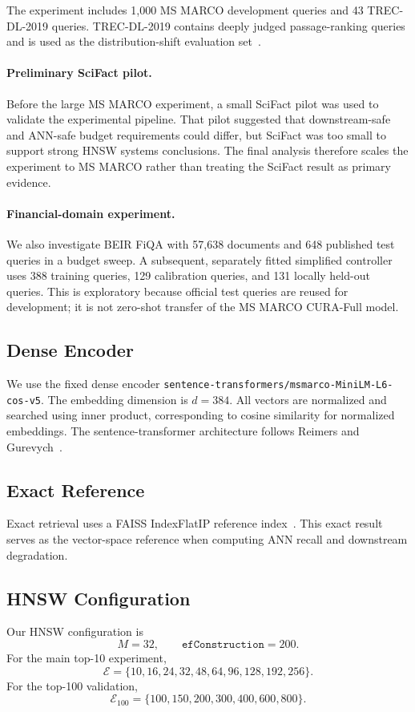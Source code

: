 \documentclass[10pt,twocolumn]{article}
\begin{document}
The experiment includes 1,000 MS MARCO development queries and 43 TREC-DL-2019 queries. TREC-DL-2019 contains deeply judged passage-ranking queries and is used as the distribution-shift evaluation set~\citep{craswell2020trecdl}.

\paragraph{Preliminary SciFact pilot.}
Before the large MS MARCO experiment, a small SciFact pilot was used to validate the experimental pipeline. That pilot suggested that downstream-safe and ANN-safe budget requirements could differ, but SciFact was too small to support strong HNSW systems conclusions. The final analysis therefore scales the experiment to MS MARCO rather than treating the SciFact result as primary evidence.

\paragraph{Financial-domain experiment.}
We also investigate BEIR FiQA with 57,638 documents and 648 published test queries in a budget sweep. A subsequent, separately fitted simplified controller uses 388 training queries, 129 calibration queries, and 131 locally held-out queries. This is exploratory because official test queries are reused for development; it is not zero-shot transfer of the MS MARCO CURA-Full model.

\subsection{Dense Encoder}
We use the fixed dense encoder \texttt{sentence-transformers/msmarco-MiniLM-L6-cos-v5}. The embedding dimension is $d=384$. All vectors are normalized and searched using inner product, corresponding to cosine similarity for normalized embeddings. The sentence-transformer architecture follows Reimers and Gurevych~\citep{reimers2019sbert}.

\subsection{Exact Reference}
Exact retrieval uses a FAISS IndexFlatIP reference index~\citep{johnson2017faiss}. This exact result serves as the vector-space reference when computing ANN recall and downstream degradation.

\subsection{HNSW Configuration}
Our HNSW configuration is
\[
M=32,\qquad \texttt{efConstruction}=200.
\]
For the main top-10 experiment,
\[
\mathcal E=\{10,16,24,32,48,64,96,128,192,256\}.
\]
For the top-100 validation,
\[
\mathcal E_{100}=\{100,150,200,300,400,600,800\}.
\]
\end{document}
